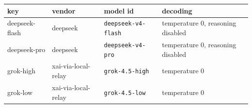 \begin{tabular}{llll}
\toprule
key & vendor & model id & decoding \\
\midrule
deepseek-flash & deepseek & \texttt{deepseek-v4-flash} & temperature 0, reasoning disabled \\
deepseek-pro & deepseek & \texttt{deepseek-v4-pro} & temperature 0, reasoning disabled \\
grok-high & xai-via-local-relay & \texttt{grok-4.5-high} & temperature 0 \\
grok-low & xai-via-local-relay & \texttt{grok-4.5-low} & temperature 0 \\
\bottomrule
\end{tabular}
